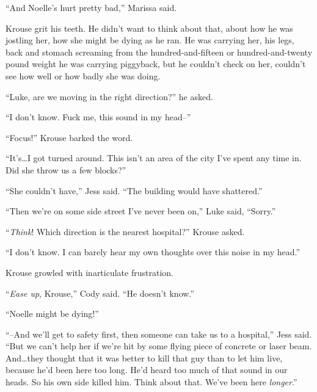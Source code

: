 ``And Noelle's hurt pretty bad,'' Marissa said.



Krouse grit his teeth.  He didn't want to think about that, about how he was jostling her, how she might be dying as he ran.  He was carrying her, his legs, back and stomach screaming from the hundred-and-fifteen or hundred-and-twenty pound weight he was carrying piggyback, but he couldn't check on her, couldn't see how well or how badly she was doing.



``Luke, are we moving in the right direction?'' he asked.



``I don't know.  Fuck me, this sound in my head--''



``Focus!''  Krouse barked the word.



``It's\ldots I got turned around.  This isn't an area of the city I've spent any time in.  Did she throw us a few blocks?''



``She couldn't have,'' Jess said.  ``The building would have shattered.''



``Then we're on some side street I've never been on,'' Luke said, ``Sorry.''



``\emph{Think}!  Which direction is the nearest hospital?'' Krouse asked.



``I don't know.  I can barely hear my own thoughts over this noise in my head.''



Krouse growled with inarticulate frustration.



``\emph{Ease up}, Krouse,'' Cody said.  ``He doesn't know.''



``Noelle might be dying!''



``--And we'll get to safety first, then someone can take us to a hospital,'' Jess said.  ``But we can't help her if we're hit by some flying piece of concrete or laser beam.  And\ldots they thought that it was better to kill that guy than to let him live, because he'd been here too long.  He'd heard too much of that sound in our heads.  So his own side killed him.  Think about that.  We've been here \emph{longer}.''




